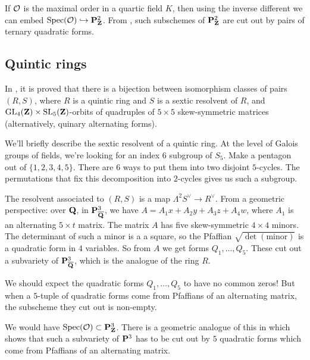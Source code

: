 If $\mathcal{O}$ is the maximal order in a quartic field $K$, then using the inverse 
different we can embed $\operatorname{Spec}(\mathcal{O})\hookrightarrow \mathbf{P}_{\mathbf{Z}}^2$. From 
\cite{ce96}, such subschemes of $\mathbf{P}_{\mathbf{Z}}^2$ are cut out by pairs of ternary 
quadratic forms. 





\subsection{Quintic rings}

In \cite{b08}, it is proved that there is a bijection between isomorphism 
classes of pairs $(R,S)$, where $R$ is a quintic ring and $S$ is a 
sextic resolvent of $R$, and $\operatorname{GL}_4(\mathbf{Z})\times \operatorname{SL}_5(\mathbf{Z})$-orbits 
of quadruples of $5\times 5$ skew-symmetric matrices (alternatively, quinary 
alternating forms). 

We'll briefly describe the sextic resolvent of a quintic ring. At the level of 
Galois groups of fields, we're looking for an index $6$ subgroup of 
$S_5$. Make a pentagon out of $\{1,2,3,4,5\}$. There are $6$ ways to put them 
into two disjoint $5$-cycles. The permutations that fix this decomposition into 
$2$-cycles gives us such a subgroup. 

The resolvent associated to $(R,S)$ is a map $\Lambda^2 S^\vee \to R^\vee$. 
From a geometric perspective: over $\mathbf{Q}$, in $\mathbf{P}_{\overline{\mathbf{Q}}}^3$, we have 
$A=A_1 x+A_2 y+A_3 z+A_4 w$, where $A_1$ is an alternating $5\times t$ matrix. 
The matrix $A$ has five skew-symmetric $4\times 4$ minors. The determinant of 
such a minor is a a square, so the Pfaffian $\sqrt{\det(\text{minor})}$ is a 
quadratic form in $4$ variables. So from $A$ we get forms $Q_1,\dots,Q_5$. 
These cut out a subvariety of $\mathbf{P}_{\overline{\mathbf{Q}}}^3$, which is the analogue 
of the ring $R$. 

We should expect the quadratic forms $Q_1,\dots,Q_5$ to have no common zeros! 
But when a $5$-tuple of quadratic forms come from Pfaffians of an alternating 
matrix, the subscheme they cut out is non-empty. 

We would have $\operatorname{Spec}(\mathcal{O})\subset \mathbf{P}_{\mathbf{Z}}^3$. There is a geometric analogue 
of this in \cite{be77} which shows that such a subvariety of $\mathbf{P}^3$ has to be 
cut out by $5$ quadratic forms which come from Pfaffians of an alternating 
matrix. 



